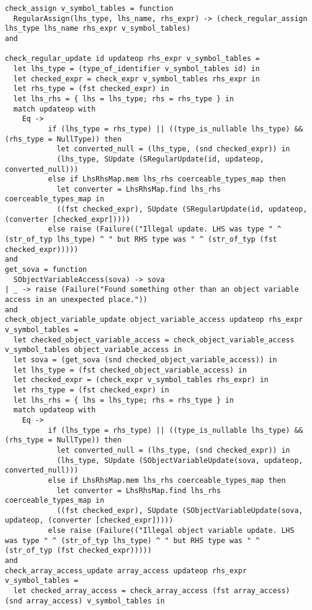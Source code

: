 \documentclass{article}
\begin{document}
\begin{verbatim}
check_assign v_symbol_tables = function
  RegularAssign(lhs_type, lhs_name, rhs_expr) -> (check_regular_assign lhs_type lhs_name rhs_expr v_symbol_tables)
and

check_regular_update id updateop rhs_expr v_symbol_tables =
  let lhs_type = (type_of_identifier v_symbol_tables id) in
  let checked_expr = check_expr v_symbol_tables rhs_expr in
  let rhs_type = (fst checked_expr) in
  let lhs_rhs = { lhs = lhs_type; rhs = rhs_type } in
  match updateop with
    Eq ->
          if (lhs_type = rhs_type) || ((type_is_nullable lhs_type) && (rhs_type = NullType)) then
            let converted_null = (lhs_type, (snd checked_expr)) in
            (lhs_type, SUpdate (SRegularUpdate(id, updateop, converted_null)))
          else if LhsRhsMap.mem lhs_rhs coerceable_types_map then
            let converter = LhsRhsMap.find lhs_rhs coerceable_types_map in
            ((fst checked_expr), SUpdate (SRegularUpdate(id, updateop, (converter [checked_expr]))))
          else raise (Failure(("Illegal update. LHS was type " ^ (str_of_typ lhs_type) ^ " but RHS type was " ^ (str_of_typ (fst checked_expr)))))
and
get_sova = function
  SObjectVariableAccess(sova) -> sova
| _ -> raise (Failure("Found something other than an object variable access in an unexpected place."))
and
check_object_variable_update object_variable_access updateop rhs_expr v_symbol_tables =
  let checked_object_variable_access = check_object_variable_access v_symbol_tables object_variable_access in
  let sova = (get_sova (snd checked_object_variable_access)) in
  let lhs_type = (fst checked_object_variable_access) in
  let checked_expr = (check_expr v_symbol_tables rhs_expr) in
  let rhs_type = (fst checked_expr) in
  let lhs_rhs = { lhs = lhs_type; rhs = rhs_type } in
  match updateop with
    Eq ->
          if (lhs_type = rhs_type) || ((type_is_nullable lhs_type) && (rhs_type = NullType)) then
            let converted_null = (lhs_type, (snd checked_expr)) in
            (lhs_type, SUpdate (SObjectVariableUpdate(sova, updateop, converted_null)))
          else if LhsRhsMap.mem lhs_rhs coerceable_types_map then
            let converter = LhsRhsMap.find lhs_rhs coerceable_types_map in
            ((fst checked_expr), SUpdate (SObjectVariableUpdate(sova, updateop, (converter [checked_expr]))))
          else raise (Failure(("Illegal object variable update. LHS was type " ^ (str_of_typ lhs_type) ^ " but RHS type was " ^ (str_of_typ (fst checked_expr)))))
and
check_array_access_update array_access updateop rhs_expr v_symbol_tables =
  let checked_array_access = check_array_access (fst array_access) (snd array_access) v_symbol_tables in

\end{verbatim}
\end{document}
